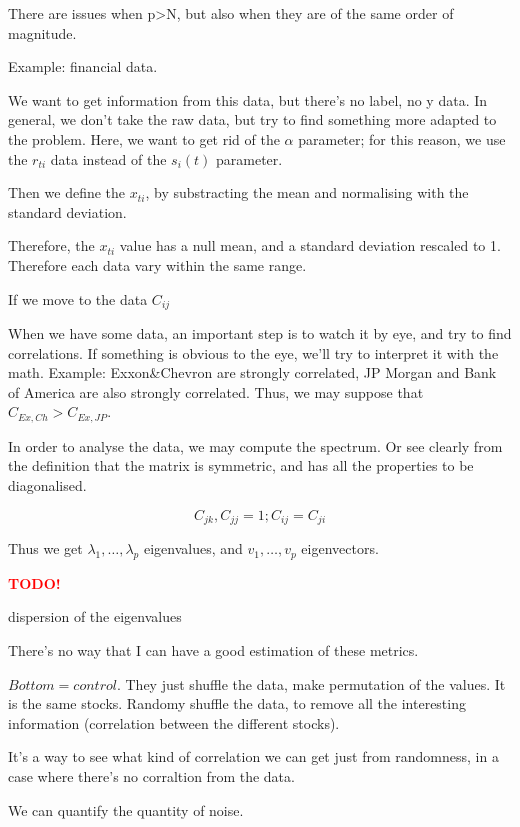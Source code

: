 \documentclass[a4paper]{tufte-book}
\newcommand{\TODO}{\textcolor{red}{\bf TODO!}\xspace}
\begin{document}
{There are issues when p>N, but also when they are of the same order of magnitude.

Example: financial data.

We want to get information from this data, but there’s no label, no y data.
In general, we don’t take the raw data, but try to find something more adapted to the problem.
Here, we want to get rid of the $\alpha$ parameter; for this reason, we use the $r_{ti}$ data instead of the $s_i(t)$ parameter.

Then we define the $x_{ti}$, by substracting the mean and normalising with the standard deviation.

Therefore, the $x_{ti}$ value has a null mean, and a standard deviation rescaled to 1. Therefore each data vary within the same range.

If we move to the data $C_{ij}$

When we have some data, an important step is to watch it by eye, and try to find correlations.
If something is obvious to the eye, we’ll try to interpret it with the math. Example: Exxon&Chevron are strongly correlated, JP Morgan and Bank of America are also strongly correlated.
Thus, we may suppose that $C_{Ex,Ch} > C_{Ex,JP}$.

In order to analyse the data, we may compute the spectrum. Or see clearly from the definition that the matrix is symmetric, and has all the properties to be diagonalised.

\begin{equation}
C_{jk}, C_{jj} = 1 ; C_{ij} = C_{ji}
\end{equation}

Thus we get $\lambda_1, … , \lambda_p$ eigenvalues, and $v_1, … , v_p$ eigenvectors.

\begin{marginfigure}
\TODO
\caption{dispersion of the eigenvalues}
\label{fig2}
\end{marginfigure}

There’s no way that I can have a good estimation of these metrics.

$Bottom = control$. They just shuffle the data, make permutation of the values. It is the same stocks. Randomy shuffle the data, to remove all the interesting information (correlation between the different stocks).

It’s a way to see what kind of correlation we can get just from randomness, in a case where there’s no corraltion from the data.

We can quantify the quantity of noise.

}
\end{document}
